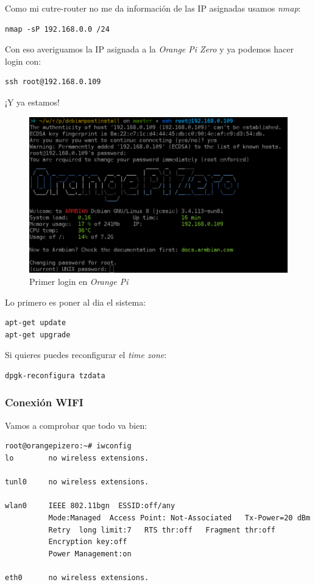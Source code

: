 \documentclass[12pt,spanish,]{scrartcl}
\begin{document}
Como mi cutre-router no me da información de las IP asignadas usamos
\emph{nmap}:

\begin{verbatim}
nmap -sP 192.168.0.0 /24
\end{verbatim}

Con eso averiguamos la IP asignada a la \emph{Orange Pi Zero} y ya
podemos hacer login con:

\begin{verbatim}
ssh root@192.168.0.109
\end{verbatim}

¡Y ya estamos!

\begin{figure}[htbp]
\centering
\includegraphics{src/img/OrangePiZero_FirstLogin.png}
\caption{Primer login en \emph{Orange Pi}}
\end{figure}

Lo primero es poner al dia el sistema:

\begin{verbatim}
apt-get update
apt-get upgrade
\end{verbatim}

Si quieres puedes reconfigurar el \emph{time zone}:

\begin{verbatim}
dpgk-reconfigura tzdata
\end{verbatim}

\subsubsection{Conexión WIFI}\label{conexiuxf3n-wifi}

Vamos a comprobar que todo va bien:

\begin{verbatim}
root@orangepizero:~# iwconfig
lo        no wireless extensions.

tunl0     no wireless extensions.

wlan0     IEEE 802.11bgn  ESSID:off/any
          Mode:Managed  Access Point: Not-Associated   Tx-Power=20 dBm
          Retry  long limit:7   RTS thr:off   Fragment thr:off
          Encryption key:off
          Power Management:on

eth0      no wireless extensions.
\end{verbatim}
\end{document}
